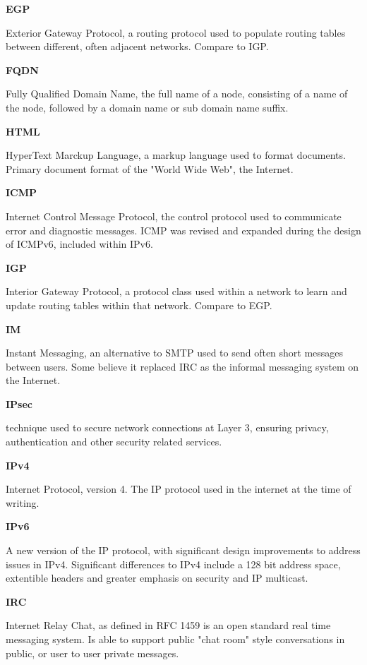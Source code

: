 \textbf{EGP}

Exterior Gateway Protocol, a routing protocol used to populate routing
tables between different, often adjacent networks. Compare to IGP.

\textbf{FQDN}

Fully Qualified Domain Name, the full name of a node, consisting of a
name of the node, followed by a domain name or sub domain name suffix.

\textbf{HTML}

HyperText Marckup Language, a markup language used to format documents.
Primary document format of the "World Wide Web", the Internet.

\textbf{ICMP}

Internet Control Message Protocol, the control protocol used to
communicate error and diagnostic messages. ICMP was revised and expanded 
during the design of ICMPv6, included within IPv6.

\textbf{IGP}

Interior Gateway Protocol, a protocol class used within a network to
learn and update routing tables within that network. Compare to EGP.

\textbf{IM}

Instant Messaging, an alternative to SMTP used to send often short
messages between users. Some believe it replaced IRC as the informal
messaging system on the Internet. 

\textbf{IPsec}

technique used to secure network connections at Layer 3, ensuring
privacy, authentication and other security related services. 

\textbf{IPv4}

Internet Protocol, version 4. The IP protocol used in the internet
at the time of writing.

\textbf{IPv6}

A new version of the IP protocol, with significant design improvements
to address issues in IPv4. Significant differences to IPv4 include a
128 bit address space, extentible headers and greater emphasis on 
security and IP multicast.

\textbf{IRC}

Internet Relay Chat, as defined in RFC 1459 is an open standard real
time messaging system. Is able to support public "chat room" style
conversations in public, or user to user private messages.

